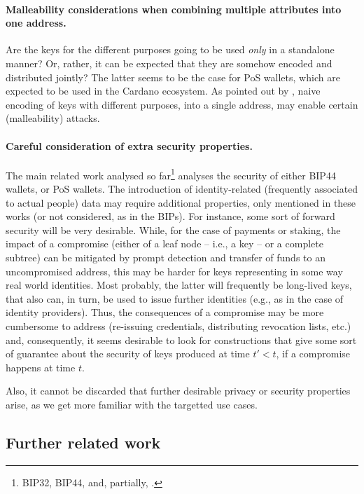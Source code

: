 \paragraph{Malleability considerations when combining multiple
  attributes into one address.} %
Are the keys for the different purposes going to be used \emph{only} in a
standalone manner? Or, rather, it can be expected that they are somehow
encoded and distributed jointly? The latter seems to be the case for PoS
wallets, which are expected to be used in the Cardano ecosystem. As pointed
out by \cite{kkl20}, naive encoding of keys with different purposes, into
a single address, may enable certain (malleability) attacks.

\paragraph{Careful consideration of extra security properties.} %
The main related work analysed so far\footnote{BIP32, BIP44, \cite{def+21}
  and, partially, \cite{kkl20}.} analyses the security of either BIP44
wallets, or PoS wallets. The introduction of identity-related (frequently
associated to actual people) data may require additional properties, only
mentioned in these works (or not considered, as in the BIPs). For instance,
some sort of forward security will be very desirable. While, for the case of
payments or staking, the impact of a compromise (either of a leaf node --
i.e., a key -- or a complete subtree) can be mitigated by prompt detection
and transfer of funds to an uncompromised address, this may be harder for
keys representing in some way real world identities. Most probably, the
latter will frequently be long-lived keys, that also can, in turn, be used
to issue further identities (e.g., as in the case of identity providers).
Thus, the consequences of a compromise may be more cumbersome to address
(re-issuing credentials, distributing revocation lists, etc.) and,
consequently, it seems desirable to look for constructions that give some
sort of guarantee about the security of keys produced at time $t' < t$, if a
compromise happens at time $t$.

Also, it cannot be discarded that further desirable privacy or security
properties arise, as we get more familiar with the targetted use cases.
  
\subsection{Further related work}

